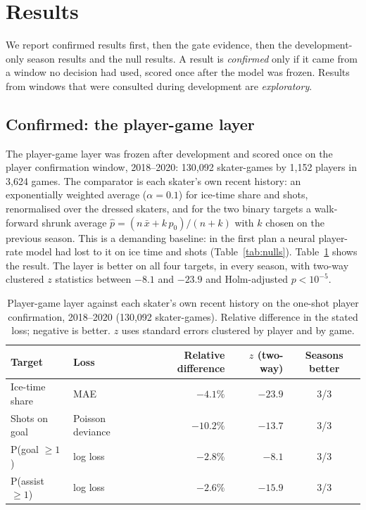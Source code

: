 \section{Results}
\label{sec:results}

We report confirmed results first, then the \neurhlG{} gate evidence, then the
development-only season results and the null results. A result is
\emph{confirmed} only if it came from a window no decision had used, scored
once after the model was frozen. Results from windows that were consulted
during development are \emph{exploratory}.

\subsection{Confirmed: the player-game layer}
\label{sec:res-pg}

The player-game layer was frozen after development and scored once on the
player confirmation window, 2018--2020: 130,092 skater-games by 1,152 players in
3,624 games. The comparator is each skater's own recent history: an
exponentially weighted average ($\alpha = 0.1$) for ice-time share and shots,
renormalised over the dressed skaters, and for the two binary targets a
walk-forward shrunk average $\hat p = (n\,\bar x + k\,p_0)/(n + k)$ \citep{efron1975data}
with $k$ chosen on the previous season. This is a demanding baseline: in the first plan a neural
player-rate model had lost to it on ice time and shots (Table~\ref{tab:nulls}).
Table~\ref{tab:pg} shows the result. The layer is better on all four targets,
in every season, with two-way clustered $z$ statistics between $-8.1$ and
$-23.9$ and Holm-adjusted $p < 10^{-5}$.

\begin{table}[t]
\centering
\small
\caption{Player-game layer against each skater's own recent history on the
one-shot player confirmation, 2018--2020 (130,092 skater-games). Relative
difference in the stated loss; negative is better. $z$ uses standard errors
clustered by player and by game.}
\label{tab:pg}
\begin{tabular}{llrrc}
\toprule
Target & Loss & Relative difference & $z$ (two-way) & Seasons better \\
\midrule
Ice-time share & MAE & $-4.1\%$ & $-23.9$ & 3/3 \\
Shots on goal & Poisson deviance & $-10.2\%$ & $-13.7$ & 3/3 \\
P(goal $\geq 1$) & log loss & $-2.8\%$ & $-8.1$ & 3/3 \\
P(assist $\geq 1$) & log loss & $-2.6\%$ & $-15.9$ & 3/3 \\
\bottomrule
\end{tabular}
\end{table}

